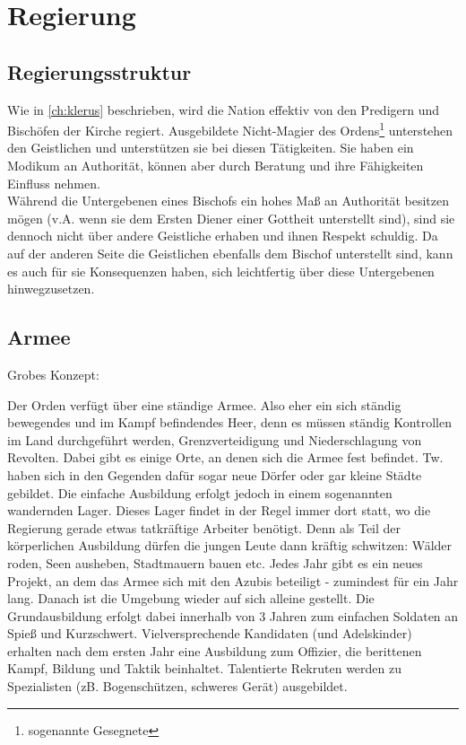\chapter{Regierung} \label{ch:regierung}

\section{Regierungsstruktur}
Wie in \ref{ch:klerus} beschrieben, wird die Nation effektiv von den Predigern und Bischöfen der Kirche regiert. 
Ausgebildete Nicht-Magier des Ordens\footnote{sogenannte Gesegnete} unterstehen den Geistlichen und unterstützen sie bei diesen Tätigkeiten. 
Sie haben ein Modikum an Authorität, können aber durch Beratung und ihre Fähigkeiten Einfluss nehmen.\\
Während die Untergebenen eines Bischofs ein hohes Maß an Authorität besitzen mögen (v.A. wenn sie dem Ersten Diener einer Gottheit unterstellt sind), sind sie dennoch nicht über andere Geistliche erhaben und ihnen Respekt schuldig.
Da auf der anderen Seite die Geistlichen ebenfalls dem Bischof unterstellt sind, kann es auch für sie Konsequenzen haben, sich leichtfertig über diese Untergebenen hinwegzusetzen.

\section{Armee}
Grobes Konzept:
\begin{outline}
	\1 Der Orden verfügt über eine ständige Armee. 
		Also eher ein sich ständig bewegendes und im Kampf befindendes Heer, denn es müssen ständig Kontrollen im Land durchgeführt werden, Grenzverteidigung und Niederschlagung von Revolten. 
		Dabei gibt es einige Orte, an denen sich die Armee fest befindet. 
		Tw. haben sich in den Gegenden dafür sogar neue Dörfer oder gar kleine Städte gebildet.
	\1 Die einfache Ausbildung erfolgt jedoch in einem sogenannten wandernden Lager. 
		Dieses Lager findet in der Regel immer dort statt, wo die Regierung gerade etwas tatkräftige Arbeiter benötigt. 
		Denn als Teil der körperlichen Ausbildung dürfen die jungen Leute dann kräftig schwitzen: Wälder roden, Seen ausheben, Stadtmauern bauen etc. 
		Jedes Jahr gibt es ein neues Projekt, an dem das Armee sich mit den Azubis beteiligt - zumindest für ein Jahr lang. 
		Danach ist die Umgebung wieder auf sich alleine gestellt.
	\1 Die Grundausbildung erfolgt dabei innerhalb von 3 Jahren zum einfachen Soldaten an Spieß und Kurzschwert. 
		Vielversprechende Kandidaten (und Adelskinder) erhalten nach dem ersten Jahr eine Ausbildung zum Offizier, die berittenen Kampf, Bildung und Taktik beinhaltet.
		Talentierte Rekruten werden zu Spezialisten (zB. Bogenschützen, schweres Gerät) ausgebildet.
\end{outline}

